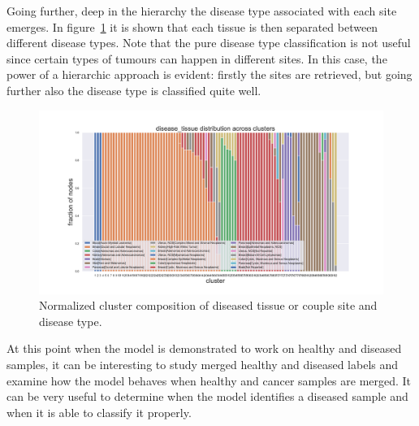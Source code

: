 Going further, deep in the hierarchy the disease type associated with each site emerges. In figure~\ref{fig:topic/tcga/fraction_clustercomposition_l2_disease_tissue} it is shown that each tissue is then separated between different disease types. Note that the pure disease type classification is not useful since certain types of tumours can happen in different sites. In this case, the power of a hierarchic approach is evident: firstly the sites are retrieved, but going further also the disease type is classified quite well.
\begin{figure}[htb!]
	\centering
	\includegraphics[width=0.9\linewidth]{pictures/topic/tcga/fraction_clustercomposition_l2_disease_tissue.pdf}
	\caption{Normalized cluster composition of diseased tissue or couple site and disease type.}
	\label{fig:topic/tcga/fraction_clustercomposition_l2_disease_tissue}
\end{figure}
\FloatBarrier
At this point when the model is demonstrated to work on healthy and diseased samples, it can be interesting to study merged healthy and diseased labels and examine how the model behaves when healthy and cancer samples are merged. It can be very useful to determine when the model identifies a diseased sample and when it is able to classify it properly.